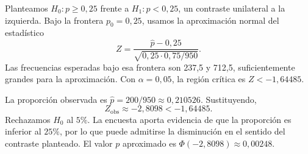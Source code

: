 Planteamos $H_0:p\ge0{,}25$ frente a $H_1:p<0{,}25$, un contraste unilateral a la izquierda. Bajo la frontera $p_0=0{,}25$, usamos la aproximación normal del estadístico
\[
 Z=\frac{\hat p-0{,}25}{\sqrt{0{,}25\cdot0{,}75/950}}.
\]
Las frecuencias esperadas bajo esa frontera son 237,5 y 712,5, suficientemente grandes para la aproximación. Con $\alpha=0{,}05$, la región crítica es $Z<-1{,}64485$.

La proporción observada es $\hat p=200/950\approx0{,}210526$. Sustituyendo,
\[
 Z_{\mathrm{obs}}\approx-2{,}8098<-1{,}64485.
\]
Rechazamos $H_0$ al $5\%$. La encuesta aporta evidencia de que la proporción es inferior al $25\%$, por lo que puede admitirse la disminución en el sentido del contraste planteado. El valor $p$ aproximado es $\Phi(-2{,}8098)\approx0{,}00248$.
